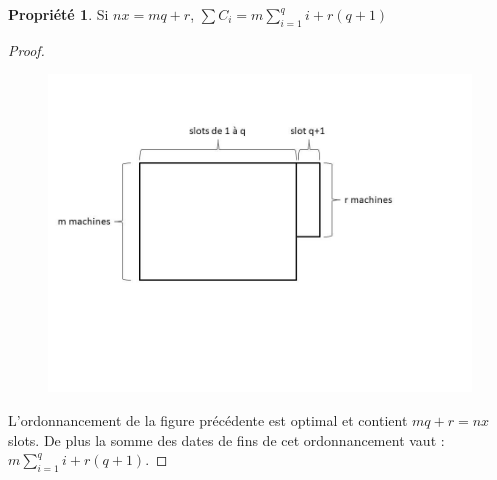 \documentclass[12pt]{article}
\theoremstyle{definition}
\newtheorem{prop}{Propriété}
\begin{document}
\begin{prop}Si $nx = mq+r$, $\sum C_i = m\sum\limits_{i=1}^q i +r(q+1)$
\end{prop}
\begin{proof}
\begin{figure}[H]
\includegraphics[scale = 0.3]{somme_opt.jpg}
\end{figure}
L'ordonnancement de la figure précédente est optimal et contient $mq+r = nx$ slots. De plus la somme des dates de fins de cet ordonnancement vaut : $m\sum\limits_{i=1}^q i +r(q+1)$.
\end{proof}
\end{document}
